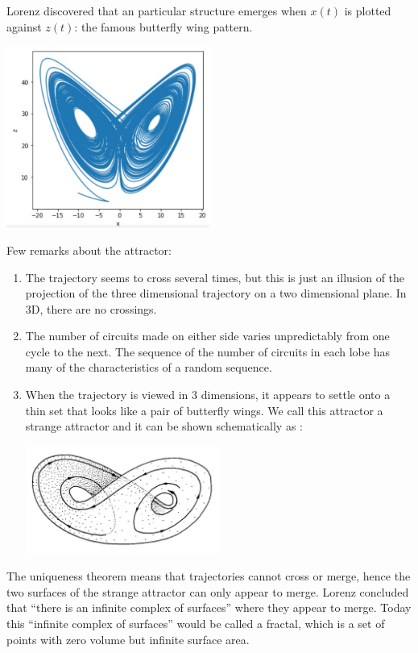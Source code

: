 \documentclass[12pt]{article}
\begin{document}
	
	\noindent Lorenz discovered that an particular structure emerges when $x(t)$ is plotted against $z(t)$: the famous butterfly wing pattern.
	\begin{center}
		\includegraphics[width=0.5\textwidth]{"images/butterfly.jpg"}
	\end{center}
	\noindent Few remarks about the attractor:
	\begin{enumerate}[label=\textbullet]
		\item The trajectory seems to cross several times, but this is just an illusion of the projection of the three dimensional trajectory on a two dimensional plane. In 3D, there are no crossings.
		\item The number of circuits made on either side varies unpredictably from one cycle to the next. The sequence of the number of circuits in each lobe has many of the characteristics of a random sequence.
		\item When the trajectory is viewed in 3 dimensions, it appears to settle onto a thin set that looks like a pair of butterfly wings. We call this attractor a strange attractor and it can be shown schematically as :
		\begin{center}
			\includegraphics[width=0.5\textwidth]{"images/butterfly3D.jpg"}
		\end{center}
	\end{enumerate}
	
	\noindent The uniqueness theorem \cite{partie1_ref2} means that trajectories cannot cross or merge, hence the two surfaces of the strange attractor can only appear to merge. Lorenz concluded that “there is an infinite
	complex of surfaces” where they appear to merge. Today this “infinite complex of surfaces” would be called a fractal, which is a set of points with zero volume but infinite surface area.
	
\end{document}
